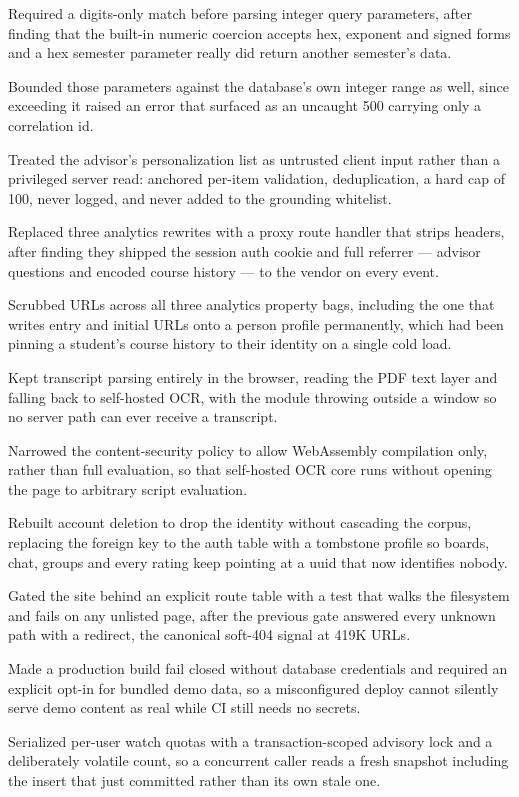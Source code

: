 \documentclass[letterpaper,11pt]{article}
\newcommand{\resumeItem}[1]{
  \item\small{
    {#1 \vspace{-2pt}}
  }
}
\begin{document}
            \resumeItem{Required a digits-only match before parsing integer query parameters, after finding that the built-in numeric coercion accepts hex, exponent and signed forms and a hex semester parameter really did return another semester's data.}
            \resumeItem{Bounded those parameters against the database's own integer range as well, since exceeding it raised an error that surfaced as an uncaught 500 carrying only a correlation id.}
            \resumeItem{Treated the advisor's personalization list as untrusted client input rather than a privileged server read: anchored per-item validation, deduplication, a hard cap of 100, never logged, and never added to the grounding whitelist.}
            \resumeItem{Replaced three analytics rewrites with a proxy route handler that strips headers, after finding they shipped the session auth cookie and full referrer --- advisor questions and encoded course history --- to the vendor on every event.}
            \resumeItem{Scrubbed URLs across all three analytics property bags, including the one that writes entry and initial URLs onto a person profile permanently, which had been pinning a student's course history to their identity on a single cold load.}
            \resumeItem{Kept transcript parsing entirely in the browser, reading the PDF text layer and falling back to self-hosted OCR, with the module throwing outside a window so no server path can ever receive a transcript.}
            \resumeItem{Narrowed the content-security policy to allow WebAssembly compilation only, rather than full evaluation, so that self-hosted OCR core runs without opening the page to arbitrary script evaluation.}
            \resumeItem{Rebuilt account deletion to drop the identity without cascading the corpus, replacing the foreign key to the auth table with a tombstone profile so boards, chat, groups and every rating keep pointing at a uuid that now identifies nobody.}
            \resumeItem{Gated the site behind an explicit route table with a test that walks the filesystem and fails on any unlisted page, after the previous gate answered every unknown path with a redirect, the canonical soft-404 signal at 419K URLs.}
            \resumeItem{Made a production build fail closed without database credentials and required an explicit opt-in for bundled demo data, so a misconfigured deploy cannot silently serve demo content as real while CI still needs no secrets.}
            \resumeItem{Serialized per-user watch quotas with a transaction-scoped advisory lock and a deliberately volatile count, so a concurrent caller reads a fresh snapshot including the insert that just committed rather than its own stale one.}
\end{document}
